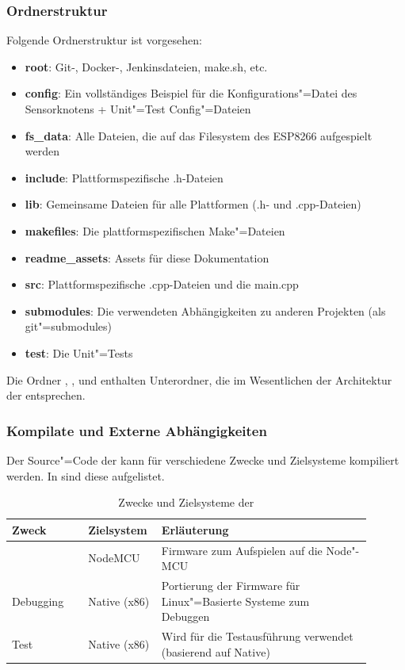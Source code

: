 \subsubsection{Ordnerstruktur}
\label{sec:skFolderStructure}
Folgende Ordnerstruktur ist vorgesehen:

\begin{itemize}
	\item \textbf{root}:             Git-, Docker-, Jenkinsdateien, make.sh, etc.
	\item \textbf{config}:           Ein vollständiges Beispiel für die Konfigurations"=Datei des Sensorknotens + Unit"=Test Config"=Dateien
	\item \textbf{fs\_data}:         Alle Dateien, die auf das Filesystem des ESP8266 aufgespielt werden
	\item \textbf{include}:          Plattformspezifische .h-Dateien
	\item \textbf{lib}:              Gemeinsame Dateien für alle Plattformen (.h- und .cpp-Dateien)
	\item \textbf{makefiles}:        Die plattformspezifischen Make"=Dateien
	\item \textbf{readme\_assets}:   Assets für diese Dokumentation
	\item \textbf{src}:              Plattformspezifische .cpp-Dateien und die main.cpp
	\item \textbf{submodules}:       Die verwendeten Abhängigkeiten zu anderen Projekten (als git"=submodules)
	\item \textbf{test}:             Die Unit"=Tests
\end{itemize}

Die Ordner , ,  und  enthalten Unterordner, die im Wesentlichen der Architektur der \skfw entsprechen.

\subsubsection{Kompilate und Externe Abhängigkeiten}
Der Source"=Code der \skfw kann für verschiedene Zwecke und Zielsysteme kompiliert werden.
In  sind diese aufgelistet.

\begin{table}[htb]
	\caption{Zwecke und Zielsysteme der \skfw}
	\begin{tabular}{|p{0.2\linewidth}|p{0.15\linewidth}|p{0.55\linewidth}|}
		\hline
		Zweck & Zielsystem & Erläuterung \\ \hline
		\skfw & NodeMCU & Firmware zum Aufspielen auf die Node"-MCU \\ \hline
		Debugging & Native (x86) & Portierung der Firmware für Linux"=Basierte Systeme zum Debuggen \\ \hline
		Test & Native (x86) & Wird für die Testausführung verwendet (basierend auf Native) \\ \hline
	\end{tabular}
	\label{tbl:sktargetsystems}
\end{table}

